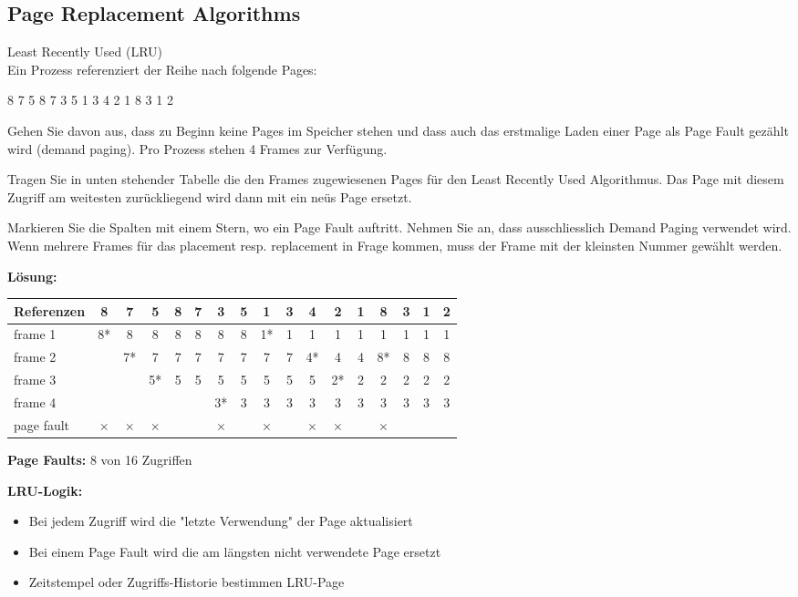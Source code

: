 \subsection{Page Replacement Algorithms}

\begin{example2}{Least Recently Used (LRU)}\\
    Ein Prozess referenziert der Reihe nach folgende Pages:
    \begin{center}
    8 7 5 8 7 3 5 1 3 4 2 1 8 3 1 2
    \end{center}
    
    Gehen Sie davon aus, dass zu Beginn keine Pages im Speicher stehen und dass auch das erstmalige Laden einer Page als Page Fault gezählt wird (demand paging). Pro Prozess stehen 4 Frames zur Verfügung.
    
    Tragen Sie in unten stehender Tabelle die den Frames zugewiesenen Pages für den Least Recently Used Algorithmus. Das Page mit diesem Zugriff am weitesten zurückliegend wird dann mit ein neüs Page ersetzt.
    
    Markieren Sie die Spalten mit einem Stern, wo ein Page Fault auftritt. Nehmen Sie an, dass ausschliesslich Demand Paging verwendet wird. Wenn mehrere Frames für das placement resp. replacement in Frage kommen, muss der Frame mit der kleinsten Nummer gewählt werden.
    
    \tcblower
    
    \textbf{Lösung:}
    
    \begin{center}
    \begin{tabular}{|l|c|c|c|c|c|c|c|c|c|c|c|c|c|c|c|c|}
    \hline
    Referenzen & 8 & 7 & 5 & 8 & 7 & 3 & 5 & 1 & 3 & 4 & 2 & 1 & 8 & 3 & 1 & 2 \\
    \hline
    frame 1 & 8* & 8 & 8 & 8 & 8 & 8 & 8 & 1* & 1 & 1 & 1 & 1 & 1 & 1 & 1 & 1 \\
    \hline
    frame 2 & & 7* & 7 & 7 & 7 & 7 & 7 & 7 & 7 & 4* & 4 & 4 & 8* & 8 & 8 & 8 \\
    \hline
    frame 3 & & & 5* & 5 & 5 & 5 & 5 & 5 & 5 & 5 & 2* & 2 & 2 & 2 & 2 & 2 \\
    \hline
    frame 4 & & & & & & 3* & 3 & 3 & 3 & 3 & 3 & 3 & 3 & 3 & 3 & 3 \\
    \hline
    page fault & × & × & × & & & × & & × & & × & × & & × & & & \\
    \hline
    \end{tabular}
    \end{center}
    
    \textbf{Page Faults:} 8 von 16 Zugriffen
    
    \textbf{LRU-Logik:}
    \begin{itemize}
        \item Bei jedem Zugriff wird die "letzte Verwendung" der Page aktualisiert
        \item Bei einem Page Fault wird die am längsten nicht verwendete Page ersetzt
        \item Zeitstempel oder Zugriffs-Historie bestimmen LRU-Page
    \end{itemize}
\end{example2}

